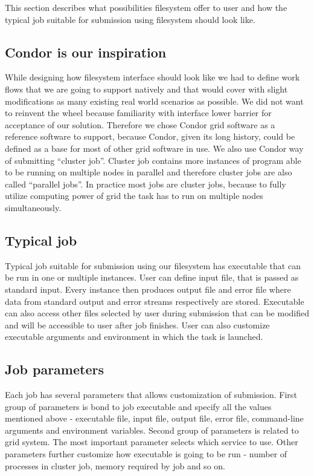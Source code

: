 \documentclass[a4paper,10pt,twocolumn]{article}
\newcommand{\term}[1]{``#1''}
\begin{document}
This section describes what possibilities filesystem offer to user and how the typical job suitable for submission using filesystem should look like.

\subsection{Condor is our inspiration}
While designing how filesystem interface should look like we had to define work flows that we are going to support natively and that would cover with slight modifications as many existing real world scenarios as possible. We did not want to reinvent the wheel because familiarity with interface lower barrier for acceptance of our solution. Therefore we chose Condor grid software as a reference software to support, because Condor, given its long history, could be defined as a base for most of other grid software in use. We also use Condor way of submitting \term{cluster job}. Cluster job contains more instances of program able to be running on multiple nodes in parallel and therefore cluster jobs are also called \term{parallel jobs}. In practice most jobs are cluster jobs, because to fully utilize computing power of grid the task has to run on multiple nodes simultaneously.

\subsection{Typical job}
Typical job suitable for submission using our filesystem has executable that can be run in one or multiple instances. User can define input file, that is passed as standard input. Every instance then produces output file and error file where data from standard output and error streams respectively are stored. Executable can also access other files selected by user during submission that can be modified and will be accessible to user after job finishes. User can also customize executable arguments and environment in which the task is launched.

\subsection{Job parameters}
Each job has several parameters that allows customization of submission. First group of parameters is bond to job executable and specify all the values mentioned above - executable file, input file, output file, error file, command-line arguments and environment variables. Second group of parameters is related to grid system. The most important parameter selects which service to use. Other parameters further customize how executable is going to be run - number of processes in cluster job, memory required by job and so on.
\end{document}
